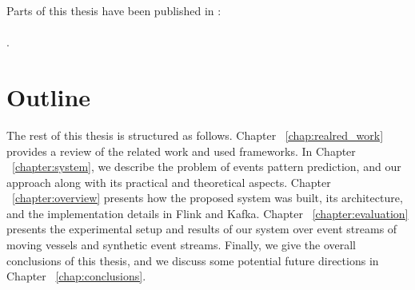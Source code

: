 Parts of this thesis have been published in \cite{Qadah}:\\ \\
.

\section{Outline }

\par The rest of this thesis is structured as follows. Chapter ~\ref{chap:realred_work} provides a review  of the related work and used frameworks. In Chapter ~\ref{chapter:system}, we describe the problem of events pattern prediction, and our approach along with its practical and theoretical aspects.
 Chapter ~\ref{chapter:overview} presents how the proposed system was built, its architecture,  and the implementation details in Flink and Kafka.
 Chapter ~\ref{chapter:evaluation} presents the experimental setup and results of our system over event streams of moving vessels and synthetic event streams. Finally, we give the overall conclusions of this thesis, and we discuss some potential future directions in Chapter ~\ref{chap:conclusions}.
	






